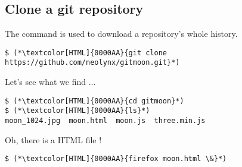 

\subsection{Clone a git repository}
\begin{frame}[fragile]
  \subslidetitle
  The command  is used to download a repository's whole history.
  \begin{lstlisting}
$ (*\textcolor[HTML]{0000AA}{git clone https://github.com/neolynx/gitmoon.git}*)
  \end{lstlisting}


  Let's see what we find ...
  \begin{lstlisting}
$ (*\textcolor[HTML]{0000AA}{cd gitmoon}*)
$ (*\textcolor[HTML]{0000AA}{ls}*)
moon_1024.jpg  moon.html  moon.js  three.min.js
  \end{lstlisting}

  Oh, there is a HTML file !
  \begin{lstlisting}
$ (*\textcolor[HTML]{0000AA}{firefox moon.html \&}*)
  \end{lstlisting}

\end{frame}

